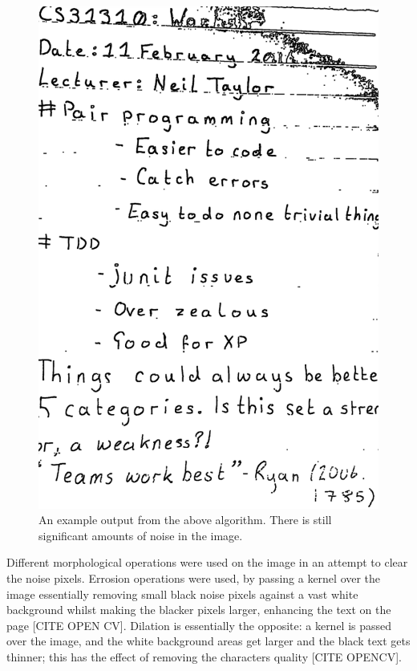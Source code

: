 \begin{figure}[H]
  \centering
  \includegraphics{images/removed_lines_still_noise}
  \caption{An example output from the above algorithm. There is still significant amounts of noise in the image.}
  \label{fig:remove_lines_noise}
\end{figure}

Different morphological operations were used on the image in an attempt to clear the noise pixels. Errosion operations were used, by passing a kernel over the image essentially removing small black noise pixels against a vast white background whilst making the blacker pixels larger, enhancing the text on the page [CITE OPEN CV]. Dilation is essentially the opposite: a kernel is passed over the image, and the white background areas get larger and the black text gets thinner; this has the effect of removing the characters quality [CITE OPENCV].

